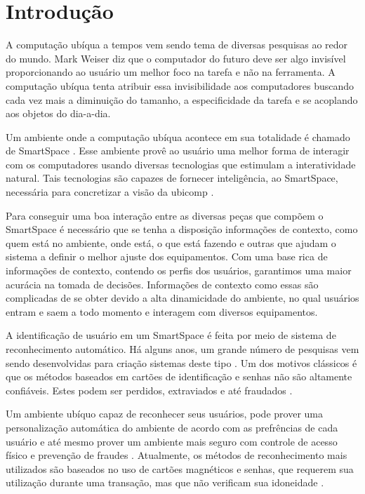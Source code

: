
\chapter{Introdução}
	
A computação ubíqua a tempos vem sendo tema de diversas pesquisas ao redor do mundo. Mark Weiser diz que o computador do futuro deve ser algo invisível \cite{weiser1, weiser2} proporcionando ao usuário um melhor foco na tarefa e não na ferramenta. A computação ubíqua tenta atribuir essa invisibilidade aos computadores buscando cada vez mais a diminuição do tamanho, a especificidade da tarefa e se acoplando aos objetos do dia-a-dia.

Um ambiente onde a computação ubíqua acontece em sua totalidade é chamado de SmartSpace \cite{gregoryabowd}. Esse ambiente provê ao usuário uma melhor forma de interagir com os computadores usando diversas tecnologias que estimulam a interatividade natural. Tais tecnologias são capazes de fornecer inteligência, ao SmartSpace, necessária para concretizar a visão da ubicomp \cite{fabriciobuzzeto}.

Para conseguir uma boa interação entre as diversas peças que compõem o SmartSpace é necessário que se tenha a disposição informações de contexto,  como quem está no ambiente, onde está, o que está fazendo e outras que ajudam o sistema a definir o melhor ajuste dos equipamentos. Com uma base rica de informações de contexto, contendo os perfis dos usuários, garantimos uma maior acurácia na tomada de decisões. Informações de contexto como essas são complicadas de se obter devido a alta dinamicidade do ambiente, no qual usuários entram e saem a todo momento e interagem com diversos equipamentos.

A identificação de usuário em um SmartSpace é feita por meio de sistema de reconhecimento automático. Há alguns anos, um grande número de pesquisas vem sendo desenvolvidas para criação sistemas deste tipo \cite{saocarlos}. Um dos motivos clássicos é que os métodos baseados em cartões de identificação e senhas não são altamente confiáveis. Estes podem ser perdidos, extraviados e até fraudados \cite{bolle}.

Um ambiente ubíquo capaz de reconhecer seus usuários, pode prover uma personalização automática do ambiente de acordo com as prefrências de cada usuário e até mesmo prover um ambiente mais seguro com controle de acesso físico e prevenção de fraudes \cite{saocarlos}. Atualmente, os métodos de reconhecimento mais utilizados são baseados no uso de cartões magnéticos e senhas, que requerem sua utilização durante uma transação, mas que não verificam sua idoneidade \cite{daugman}.

